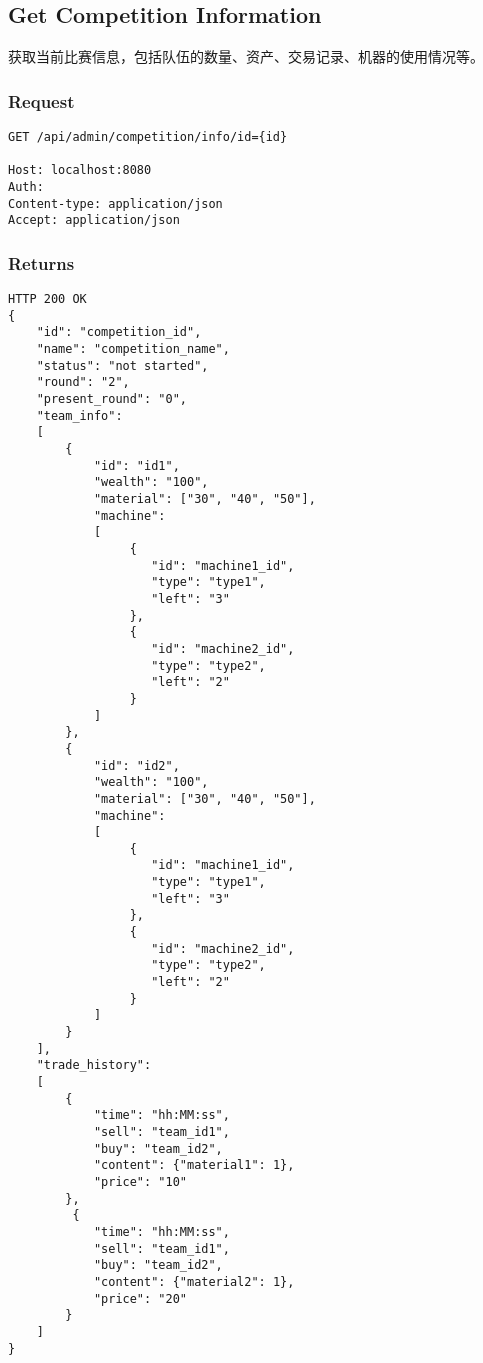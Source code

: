 \documentclass{article}
\begin{document}
\subsection{Get Competition Information}
获取当前比赛信息，包括队伍的数量、资产、交易记录、机器的使用情况等。

\subsubsection*{Request}
\begin{lstlisting}
GET /api/admin/competition/info/id={id}

Host: localhost:8080
Auth:
Content-type: application/json
Accept: application/json
\end{lstlisting}

\subsubsection*{Returns}
\begin{lstlisting}
HTTP 200 OK
{
    "id": "competition_id",
    "name": "competition_name",
    "status": "not started",
    "round": "2",
    "present_round": "0",
    "team_info":
    [
        {
            "id": "id1",
            "wealth": "100",
            "material": ["30", "40", "50"],
            "machine":
            [
                 {
                    "id": "machine1_id",
                    "type": "type1",
                    "left": "3"
                 },
                 {
                    "id": "machine2_id",
                    "type": "type2",
                    "left": "2"
                 }
            ]
        },
        {
            "id": "id2",
            "wealth": "100",
            "material": ["30", "40", "50"],
            "machine":
            [
                 {
                    "id": "machine1_id",
                    "type": "type1",
                    "left": "3"
                 },
                 {
                    "id": "machine2_id",
                    "type": "type2",
                    "left": "2"
                 }
            ]
        }
    ],
    "trade_history":
    [
        {
            "time": "hh:MM:ss",
            "sell": "team_id1",
            "buy": "team_id2",
            "content": {"material1": 1},
            "price": "10"
        },
         {
            "time": "hh:MM:ss",
            "sell": "team_id1",
            "buy": "team_id2",
            "content": {"material2": 1},
            "price": "20"
        }
    ]
}

\end{lstlisting}
\end{document}
